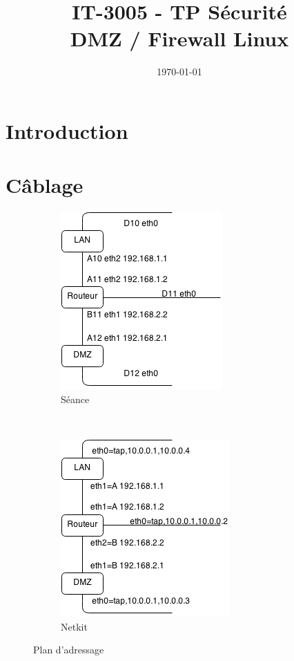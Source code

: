 \documentclass[frenchb, 11pt]{article}
\title{
	\textbf{IT-3005 - TP Sécurité}\\
	DMZ / Firewall Linux
}
\date{\today}
\begin{document}
\maketitle
\newpage


\section{Introduction}

\section{Câblage}

\begin{figure}[h!]
	\centering
	\begin{subfigure}[b]{0.4\textwidth}
		\includegraphics[scale=0.80]{sch1.png}
		\caption{Séance}
	\end{subfigure}%
	~
	\begin{subfigure}[b]{0.4\textwidth}
	\includegraphics[scale=0.80]{sch2.png}
	\caption{Netkit}
	\label{fig:planadrnetkit}
	\end{subfigure}
	\caption{Plan d'adressage}
\end{figure}
\end{document}
